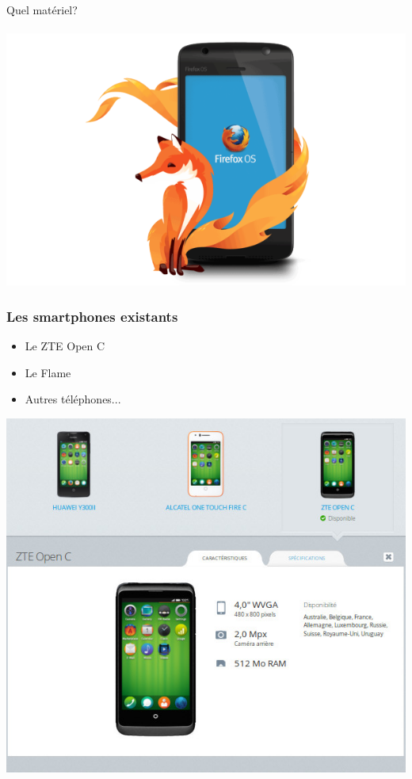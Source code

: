 \documentclass{beamer}
\begin{document}
\begin{frame}
\begin{center}
\Huge{Quel matériel?}
\\~\\
\includegraphics[scale=0.3]{./images/FirefoxOS-logo_610x385.png}
\end{center}
\end{frame}
\begin{frame}
\frametitle{Les smartphones existants}
\begin{itemize}
\item Le ZTE Open C
\item Le Flame
\item Autres téléphones...
\end{itemize}
\begin{center}
\includegraphics[scale=0.3]{./images/smartphone01.jpg}
\end{center}
\end{frame}
\end{document}
